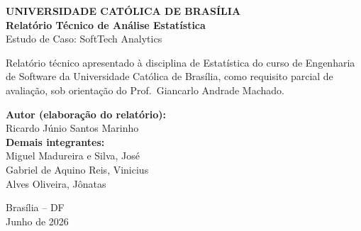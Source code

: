 \documentclass[a4paper, 12pt]{article}
\begin{document}
\begin{titlepage}
	\begin{center}
		\Large{\textbf{UNIVERSIDADE CATÓLICA DE BRASÍLIA}}\\
		\vspace{85pt}
		\textbf{\LARGE{Relatório Técnico de Análise Estatística}}\\
		\vspace{8pt}
		\large{Estudo de Caso: SoftTech Analytics}\\
	\end{center}
	\vspace{1.5cm}

	\begin{flushright}
		\begin{minipage}{0.55\textwidth}
			Relatório técnico apresentado à disciplina de Estatística do
			curso de Engenharia de Software da Universidade Católica de
			Brasília, como requisito parcial de avaliação, sob orientação
			do Prof.\ Giancarlo Andrade Machado.
		\end{minipage}
	\end{flushright}

	\vspace{1cm}
	\begin{flushright}
		\begin{minipage}{0.55\textwidth}
			\textbf{Autor (elaboração do relatório):}\\
			Ricardo Júnio Santos Marinho\\[8pt]
			\textbf{Demais integrantes:}\\
			Miguel Madureira e Silva, José\\
			Gabriel de Aquino Reis, Vinicius\\
			Alves Oliveira, Jônatas
		\end{minipage}
	\end{flushright}

	\begin{center}
		\vspace{\fill}
		Brasília -- DF\\
		Junho de 2026
	\end{center}
\end{titlepage}

\newpage
\tableofcontents
\thispagestyle{empty}
\end{document}
